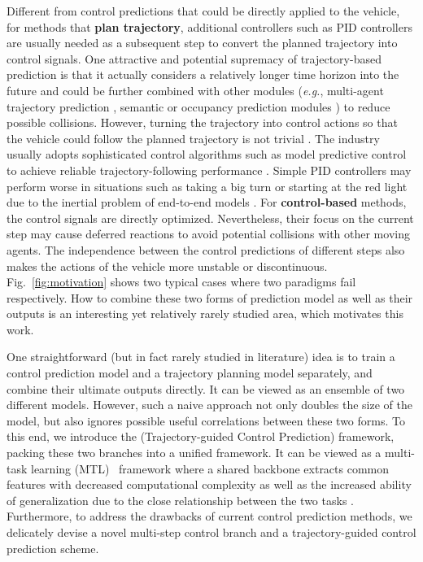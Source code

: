 \documentclass{article}
\begin{document}
Different from control predictions that could be directly applied to the vehicle, for methods that \textbf{plan trajectory}, additional controllers such as PID controllers are usually needed as a subsequent step to convert the planned trajectory into control signals.
One attractive and potential supremacy of trajectory-based prediction is that it actually considers a relatively longer time horizon into the future and could be further combined with other modules (\textit{e.g.}, multi-agent trajectory prediction \citep{zhang2021lbw, chen2022lav}, semantic or occupancy prediction modules \citep{chitta2021neat, casas2021mp3, hu2022stp3}) to reduce possible collisions.
However, turning the trajectory into control actions so that the vehicle could follow the planned trajectory is not trivial \citep{zablocki2021xai}. The industry usually adopts sophisticated control algorithms such as model predictive control to achieve reliable trajectory-following performance \citep{camacho2013mpc, guo2019mpcfollowing}. Simple PID controllers may perform worse in situations such as taking a big turn or starting at the red light due to the inertial problem of end-to-end models \citep{jaeger2021transfuser+}.
For \textbf{control-based} methods, the control signals are directly optimized. Nevertheless, their focus on the current step may cause deferred reactions to avoid potential collisions with other moving agents. The independence between the control predictions of different steps also makes the actions of the vehicle more unstable or discontinuous.
Fig.~\ref{fig:motivation} shows two typical cases where two paradigms fail respectively.
How to combine these two forms of prediction model as well as their outputs is an interesting yet relatively rarely studied area, which motivates this work. 

One straightforward (but in fact rarely studied in literature) idea is to train a control prediction model and a trajectory planning model separately, and combine their ultimate outputs directly. It can be viewed as an ensemble of two different models.
However, such a naive approach not only doubles the size of the model, but also ignores possible useful correlations between these two forms. To this end, we introduce the \textbf{\algname} (Trajectory-guided Control Prediction) framework, packing these two branches into a unified framework.
It can be viewed as a multi-task learning (MTL)~\cite{caruana1997mtl, argyriou2006mtfl} framework where a shared backbone extracts common features with decreased computational complexity 
as well as the increased ability of generalization due to the close relationship between the two tasks \citep{liang2019multi3d, kumar2021omnidet, chen2022persformer}.
Furthermore, to address the drawbacks of current control prediction methods, we delicately devise a novel multi-step control branch and a trajectory-guided control prediction scheme.
\end{document}
